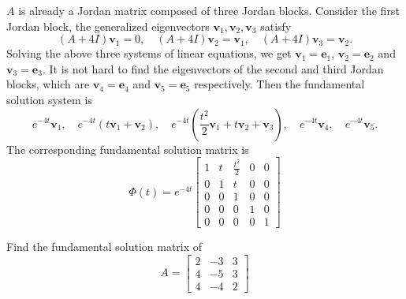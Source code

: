 \begin{solution}
  $A$ is already a Jordan matrix composed of three Jordan blocks.
  Consider the first Jordan block, the generalized eigenvectors $\mathbf{v}_1, \mathbf{v}_2, \mathbf{v}_3$ satisfy
  \begin{equation}
    (A + 4I)\mathbf{v}_1 = 0, \quad (A + 4I)\mathbf{v}_2 = \mathbf{v}_1, \quad
    (A + 4I)\mathbf{v}_3 = \mathbf{v}_2.
  \end{equation}
  Solving the above three systems of linear equations, we get
  $\mathbf{v}_1 = \mathbf{e}_1$, $\mathbf{v}_2 = \mathbf{e}_2$ and $\mathbf{v}_3 = \mathbf{e}_3$.
  It is not hard to find the eigenvectors of the second and third Jordan blocks,
  which are $\mathbf{v}_4 = \mathbf{e}_4$ and $\mathbf{v}_5 = \mathbf{e}_5$ respectively.
  Then the fundamental solution system is
  \begin{equation}
    e^{-4t}\mathbf{v}_1,\quad
    e^{-4t}(t\mathbf{v}_1+\mathbf{v}_2),\quad
    e^{-4t}(\frac{t^2}{2}\mathbf{v}_1+t\mathbf{v}_2+\mathbf{v}_3),\quad
    e^{-4t}\mathbf{v}_4,\quad
    e^{-4t}\mathbf{v}_5.
  \end{equation}
  The corresponding fundamental solution matrix is
  \begin{equation}
    \Phi(t) = e^{-4t}
      \begin{bmatrix}
      1 & t & \frac{t^2}{2} & 0 & 0 \\
      0 & 1 & t & 0 & 0 \\
      0 & 0 & 1 & 0 & 0 \\
      0 & 0 & 0 & 1 & 0 \\
      0 & 0 & 0 & 0 & 1
      \end{bmatrix}
  \end{equation}
\end{solution}

\begin{exercise}{}{}
  Find the fundamental solution matrix of
  \begin{equation}
    A = 
    \begin{bmatrix}
    2 & -3 & 3 \\
    4 & -5 & 3 \\
    4 & -4 & 2
    \end{bmatrix}
  \end{equation}
\end{exercise}





